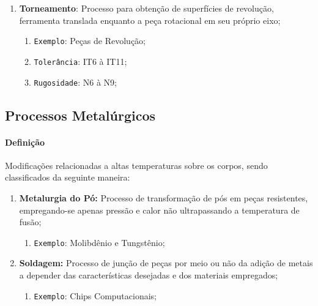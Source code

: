 \documentclass{article}
\begin{document}
\begin{enumerate}[rightmargin = \leftmargin]
                    \item \textbf{Torneamento}: Processo para obtenção de superfícies de revolução, ferramenta translada enquanto a peça rotacional em seu próprio eixo;
                        \begin{enumerate}[rightmargin = \leftmargin, noitemsep]
                            \item \texttt{Exemplo}: Peças de Revolução;
                            \item \texttt{Tolerância}: IT6 à IT11;
                            \item \texttt{Rugosidade}: N6 à N9;
                        \end{enumerate}
                \end{enumerate}

        \subsection{Processos Metalúrgicos}
            \paragraph{Definição}Modificações relacionadas a altas temperaturas sobre os corpos, sendo classificados da seguinte maneira:
                \begin{enumerate}[rightmargin = \leftmargin]
                    \item \textbf{Metalurgia do Pó:} Processo de transformação de pós em peças resistentes, empregando-se apenas pressão e calor não ultrapassando a temperatura de fusão;
                        \begin{enumerate}[rightmargin = \leftmargin, noitemsep]
                            \item \texttt{Exemplo}: Molibdênio e Tungstênio;
                        \end{enumerate}

                    \item \textbf{Soldagem:} Processo de junção de peças por meio ou não da adição de metais a depender das características desejadas e dos materiais empregados;
                        \begin{enumerate}[rightmargin = \leftmargin, noitemsep]
                            \item \texttt{Exemplo}: Chips Computacionais;
                        \end{enumerate}
                \end{enumerate}
\end{document}

